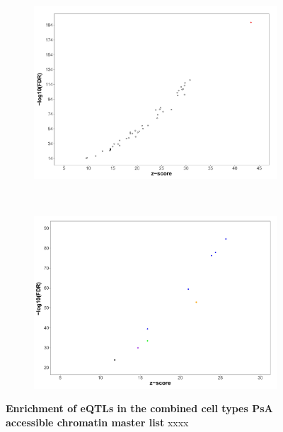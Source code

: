 \bigskip
\begin{figure}[H]
\centering
\begin{subfigure}[b]{0.7\textwidth}
\centering 
\includegraphics[width=\textwidth]{./Results3/pdfs/ATAC_PSA_all_GTeX_eQTL_enrichment_dotplot}
\caption{}
\end{subfigure}
~
\begin{subfigure}[b]{0.7\textwidth} 
\centering
\includegraphics[width=\textwidth]{./Results3/pdfs/ATAC_PSA_all_Jknight_eQTL_enrichment_dotplot}
\caption{}
\end{subfigure}
\caption[Enrichment of eQTLs in the combined cell types PsA accessible chromatin master list.]{\textbf{Enrichment of eQTLs in the combined cell types PsA accessible chromatin master list} xxxx}
\label{figure:PsA_FAST_ATAC_eQTL_enrichment}
\end{figure}





